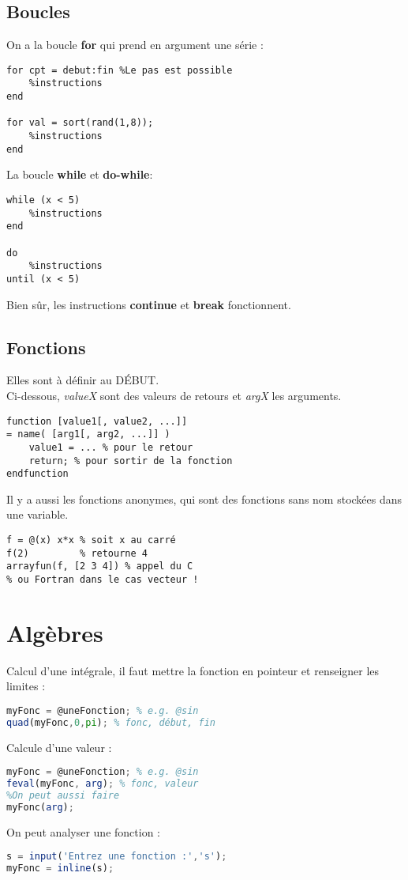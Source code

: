         \subsection{Boucles}
            On a la boucle \textbf{for} qui prend en argument une série :
            \begin{lstlisting}
for cpt = debut:fin %Le pas est possible
	%instructions
end

for val = sort(rand(1,8));
	%instructions
end
            \end{lstlisting}
            La boucle \textbf{while} et \textbf{do-while}:
            \begin{lstlisting}
while (x < 5)
	%instructions
end

do
	%instructions
until (x < 5)
            \end{lstlisting}
            Bien sûr, les instructions \textbf{continue} et \textbf{break} fonctionnent.
        \subsection{Fonctions}
            Elles sont à définir au DÉBUT.\\
            Ci-dessous, \textit{valueX} sont des valeurs de retours et \textit{argX} les arguments.
            \begin{lstlisting}
function [value1[, value2, ...]]
= name( [arg1[, arg2, ...]] )
    value1 = ... % pour le retour
    return; % pour sortir de la fonction
endfunction
            \end{lstlisting}
            Il y a aussi les fonctions anonymes, qui sont des fonctions sans nom stockées dans une variable.
            \begin{lstlisting}
f = @(x) x*x % soit x au carré
f(2)         % retourne 4 
arrayfun(f, [2 3 4]) % appel du C
% ou Fortran dans le cas vecteur !
            \end{lstlisting}
    \section{Algèbres}
        Calcul d'une intégrale, il faut mettre la fonction en pointeur et renseigner les limites :
        \begin{lstlisting}[language=Octave]
myFonc = @uneFonction; % e.g. @sin
quad(myFonc,0,pi); % fonc, début, fin
        \end{lstlisting}
        Calcule d'une valeur :
        \begin{lstlisting}[language=Octave]
myFonc = @uneFonction; % e.g. @sin
feval(myFonc, arg); % fonc, valeur
%On peut aussi faire
myFonc(arg);
        \end{lstlisting}
        On peut analyser une fonction :
        \begin{lstlisting}[language=Octave]
s = input('Entrez une fonction :','s');
myFonc = inline(s);
        \end{lstlisting}
